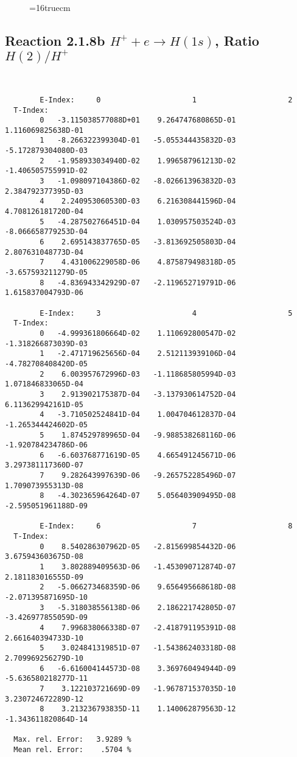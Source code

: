 \documentclass[12pt,dvipdfmx]{article}
\begin{document}
\begin{figure} \label{2.1.8ra}
\epsfxsize=16truecm
\end{figure}
\newpage



\subsection{
Reaction 2.1.8b  $H^+ + e \rightarrow H(1s) $,  Ratio $H(2)/H^+$
}

\begin{small}\begin{verbatim}


        E-Index:     0                     1                     2
  T-Index:
        0   -3.115038577088D+01    9.264747680865D-01    1.116069825638D-01
        1   -8.266322399304D-01   -5.055344435832D-03   -5.172879304080D-03
        2   -1.958933034940D-02    1.996587961213D-02   -1.406505755991D-02
        3   -1.098097104386D-02   -8.026613963832D-03    2.384792377395D-03
        4    2.240953060530D-03    6.216308441596D-04    4.708126181720D-04
        5   -4.287502766451D-04    1.030957503524D-03   -8.066658779253D-04
        6    2.695143837765D-05   -3.813692505803D-04    2.807631048773D-04
        7    4.431006229058D-06    4.875879498318D-05   -3.657593211279D-05
        8   -4.836943342929D-07   -2.119652719791D-06    1.615837004793D-06

        E-Index:     3                     4                     5
  T-Index:
        0   -4.999361806664D-02    1.110692800547D-02   -1.318266873039D-03
        1   -2.471719625656D-04    2.512113939106D-04   -4.782708408420D-05
        2    6.003957672996D-03   -1.118685805994D-03    1.071846833065D-04
        3    2.913902175387D-04   -3.137930614752D-04    6.113629942161D-05
        4   -3.710502524841D-04    1.004704612837D-04   -1.265344424602D-05
        5    1.874529789965D-04   -9.988538268116D-06   -1.920784234786D-06
        6   -6.603768771619D-05    4.665491245671D-06    3.297381117360D-07
        7    9.282643997639D-06   -9.265752285496D-07    1.709073955313D-08
        8   -4.302365964264D-07    5.056403909495D-08   -2.595051961188D-09

        E-Index:     6                     7                     8
  T-Index:
        0    8.540286307962D-05   -2.815699854432D-06    3.675943603675D-08
        1    3.802889409563D-06   -1.453090712874D-07    2.181183016555D-09
        2   -5.066273468359D-06    9.656495668618D-08   -2.071395871695D-10
        3   -5.318038556138D-06    2.186221742805D-07   -3.426977855059D-09
        4    7.996838066338D-07   -2.418791195391D-08    2.661640394733D-10
        5    3.024841319851D-07   -1.543862403318D-08    2.709969256279D-10
        6   -6.616004144573D-08    3.369760494944D-09   -5.636580218277D-11
        7    3.122103721669D-09   -1.967871537035D-10    3.230724672289D-12
        8    3.213236793835D-11    1.140062879563D-12   -1.343611820864D-14

  Max. rel. Error:   3.9289 %
  Mean rel. Error:    .5704 %

\end{verbatim}\end{small}
\end{document}
